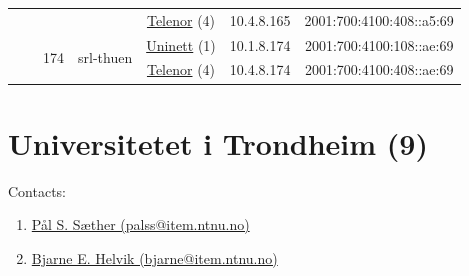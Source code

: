\begin{small}
\begin{center}
\begin{longtable}{|c|c|c|c|c|c|c|c|}
  &  &  &  & \multicolumn{2}{|c|}{\tiny{\href{https://www.telenor.no}{Telenor} (4)}} & \tiny{10.4.8.165} & \tiny{2001:700:4100:408::a5:69} \\* \cline{3-3}\cline{4-4}\cline{5-5}\cline{6-6}\cline{7-7}\cline{8-8}
  &  & \multirow{2}{*}{\tiny{174}} & \multicolumn{1}{|l|}{\multirow{2}{*}{\tiny{srl-thuen}}} & \multicolumn{2}{|c|}{\tiny{\href{https://www.uninett.no}{Uninett} (1)}} & \tiny{10.1.8.174} & \tiny{2001:700:4100:108::ae:69} \\* \cline{5-5}\cline{6-6}\cline{7-7}\cline{8-8}
  &  &  &  & \multicolumn{2}{|c|}{\tiny{\href{https://www.telenor.no}{Telenor} (4)}} & \tiny{10.4.8.174} & \tiny{2001:700:4100:408::ae:69} \\ \hline
\end{longtable}
\end{center}
\end{small}



\section{Universitetet i Trondheim (9)}
\label{sec:NTNU}

Contacts:
\begin{enumerate}
 \item {}\href{mailto:palss@item.ntnu.no}{Pål S. Sæther (palss@item.ntnu.no)}
 \item {}\href{mailto:bjarne@item.ntnu.no}{Bjarne E. Helvik (bjarne@item.ntnu.no)}
\end{enumerate}


